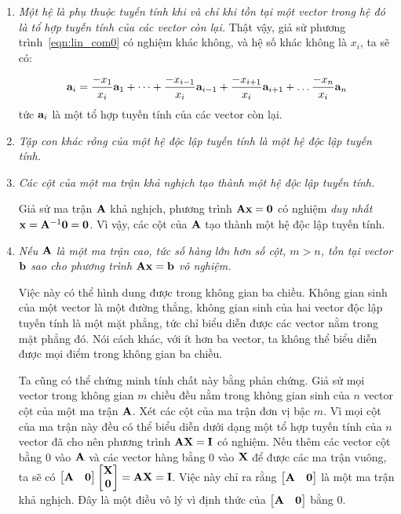 \begin{enumerate}
\item \textit{Một hệ là phụ thuộc tuyến tính khi và chỉ khi tồn tại một
vector trong hệ đó là tổ hợp tuyến tính của các vector còn lại. } Thật vậy,
giả sử phương trình~\eqref{eqn:lin_com0} có nghiệm khác không, và hệ số khác không là $x_i$, ta sẽ có:

\begin{equation}
\mathbf{a}_i = \frac{-x_1}{x_i} \mathbf{a}_1 + \dots + \frac{-x_{i-1}}{x_i}\mathbf{a}_{i-1} +
\frac{-x_{i+1}}{x_i}\mathbf{a}_{i+1} + \dots \frac{-x_n}{x_i}\mathbf{a}_n
\end{equation}
tức $\mathbf{a}_i$ là một tổ hợp tuyến tính của các vector còn lại. %


\item \textit{Tập con khác rỗng của một hệ độc lập tuyến tính là một hệ độc
lập tuyến tính.}



\item \textit{Các cột của một ma trận khả nghịch tạo thành một hệ độc lập
tuyến tính.}

Giả sử ma trận $\mathbf{A}$ khả nghịch, phương trình $\mathbf{A}\mathbf{x} = \mathbf{0}$ có
nghiệm \textit{duy nhất} $\mathbf{x} = \mathbf{A}^{-1}\mathbf{0} = \mathbf{0}$. Vì vậy,
các cột của $\mathbf{A}$ tạo thành một hệ độc lập tuyến tính.


\item \textit{Nếu $\mathbf{A}$ là một ma trận cao, tức số hàng lớn hơn số cột, $m >
n$, tồn tại vector $\mathbf{b}$ sao cho phương trình $\mathbf{A}\mathbf{x} = \mathbf{b}$ vô nghiệm. }

Việc này có thể hình dung được trong không gian ba chiều. Không gian sinh
của một vector là một đường thẳng, không gian sinh của hai vector độc lập
tuyến tính là một mặt phẳng, tức chỉ biểu diễn được các vector nằm trong mặt
phẳng đó. Nói cách khác, với ít hơn ba vector, ta không thể biểu diễn được
mọi điểm trong không gian ba chiều.

Ta cũng có thể chứng minh tính chất này bằng phản chứng. Giả sử mọi vector
trong không gian $m$ chiều đều nằm trong không gian sinh của $n$ vector cột
của một ma trận $\mathbf{A}$. Xét các cột của ma trận đơn vị bậc $m$. Vì mọi cột
của ma trận này đều có thể biểu diễn dưới dạng một tổ hợp tuyến tính của $n$
vector đã cho nên phương trình $\mathbf{A}\mathbf{X} = \mathbf{I}$ có nghiệm. Nếu thêm các vector
cột bằng 0 vào $\mathbf{A}$ và các vector hàng bằng 0 vào $\mathbf{X}$ để được các ma trận
vuông, ta sẽ có $\left[\begin{matrix} \mathbf{A} & \mathbf{0} \end{matrix}\right] \left[\begin{matrix} \mathbf{X} \\
\mathbf{0} \end{matrix}\right] = \mathbf{A}\mathbf{X} = \mathbf{I}$. Việc này chỉ ra rằng $\left[\begin{matrix} \mathbf{A} & \mathbf{0} \end{matrix}\right]$ là
một ma trận khả nghịch. Đây là một điều vô lý vì định thức của $\left[\begin{matrix} \mathbf{A} &
\mathbf{0} \end{matrix}\right]$ bằng 0.


\end{enumerate}

